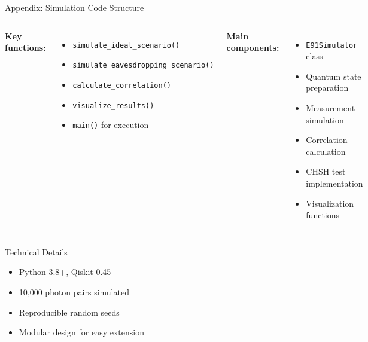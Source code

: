 \documentclass[10pt]{beamer}
\begin{document}
\appendix

\begin{frame}{Appendix: Simulation Code Structure}
    \begin{columns}[T] %
        \textbf{Key functions:}
        \begin{itemize}
            \item \texttt{simulate\_ideal\_scenario()}
            \item \texttt{simulate\_eavesdropping\_scenario()}
            \item \texttt{calculate\_correlation()}
            \item \texttt{visualize\_results()}
            \item \texttt{main()} for execution
        \end{itemize}

        \textbf{Main components:}
        \begin{itemize}
            \item \texttt{E91Simulator} class
            \item Quantum state preparation
            \item Measurement simulation
            \item Correlation calculation
            \item CHSH test implementation
            \item Visualization functions
        \end{itemize}
    \end{columns}

    \vspace{4mm}

    \begin{block}{Technical Details}
        \begin{itemize}
            \item Python 3.8+, Qiskit 0.45+
            \item 10,000 photon pairs simulated
            \item Reproducible random seeds
            \item Modular design for easy extension
        \end{itemize}
    \end{block}
    \end{frame}
\end{document}
